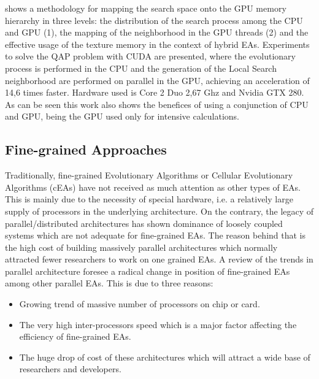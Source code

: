 \documentclass[prodmode,acmtecs]{acmsmall}
\begin{document}
\cite{5586403} shows a methodology for mapping the search space onto the GPU memory hierarchy in three levels: the distribution of the search process among the CPU and GPU (1), the mapping of the neighborhood in the GPU threads (2) and the effective usage of the texture memory in the context of hybrid EAs. Experiments to solve the QAP problem with CUDA are presented, where the evolutionary process is performed in the CPU and the generation of the Local Search neighborhood are performed on parallel in the GPU, achieving an acceleration of 14,6 times faster. Hardware used is Core 2 Duo 2,67 Ghz and Nvidia GTX 280. As can be seen this work also shows the benefices of using a conjunction of CPU and GPU, being the GPU used only for intensive calculations. %

\subsection{Fine-grained Approaches}

Traditionally, fine-grained Evolutionary Algorithms or Cellular Evolutionary Algorithms (cEAs) have not received as much attention as other types of EAs. This is mainly due to the necessity of special hardware, i.e. a relatively large supply of processors in the underlying architecture. On the contrary, the legacy of parallel/distributed architectures has shown dominance of loosely coupled systems which are not adequate for fine-grained EAs. The reason behind that is the high cost of building massively parallel architectures which normally attracted fewer researchers to work on one grained EAs. A review of the trends in parallel architecture foresee a radical change in position of fine-grained EAs among other parallel EAs. This is due to three reasons:

\begin{itemize}
 \item Growing trend of massive number of processors on chip or card. 
\item The very high inter-processors speed which is a major factor affecting the efficiency of fine-grained EAs. 
\item The huge drop of cost of these architectures which will attract a wide base of researchers and developers.
\end{itemize}
\end{document}
